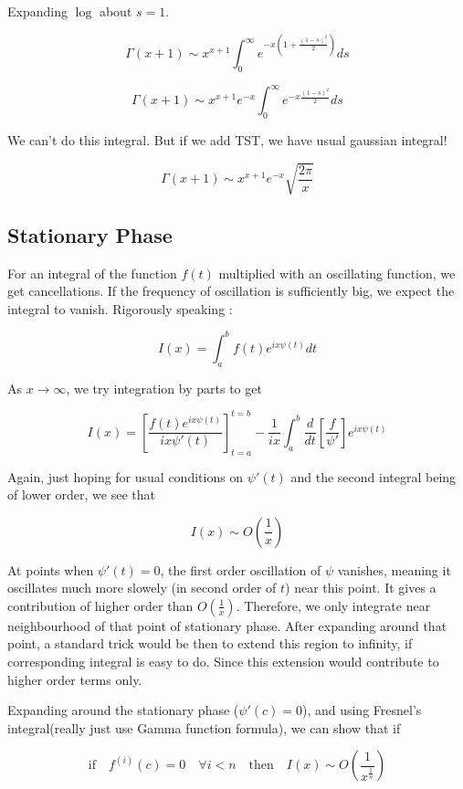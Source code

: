 \documentclass{report}
\begin{document}
\noindent Expanding $\log$ about $s=1$.

$$\Gamma(x+1) \sim x^{x+1}\int_{0}^{\infty}e^{-x\left(1+\frac{(1-s)^2}{2}\right)}ds$$

$$\Gamma(x+1) \sim x^{x+1}e^{-x}\int_{0}^{\infty}e^{-x\frac{(1-s)^2}{2}}ds$$

\noindent We can't do this integral. But if we add TST, we have usual gaussian integral!

$$\Gamma(x+1) \sim x^{x+1}e^{-x} \sqrt{\frac{2\pi}{x}}$$

\subsection{Stationary Phase}

For an integral of the function $f(t)$ multiplied with an oscillating function, we get cancellations. If the frequency of oscillation is sufficiently big, we expect the integral to vanish. Rigorously speaking :

$$I(x) = \int_{a}^{b}f(t)e^{ix\psi(t)}dt$$

\noindent As $x\to\infty$, we try integration by parts to get


$$I(x) = \left[\frac{f(t)e^{ix\psi(t)}}{ix\psi'(t)}\right]_{t=a}^{t=b} - \frac{1}{ix}\int_{a}^{b}\frac{d}{dt}\left[\frac{f}{\psi'}\right]e^{ix\psi(t)}$$

\noindent Again, just hoping for usual conditions on $\psi'(t)$ and the second integral being of lower order, we see that 

$$I(x) \sim O\left(\frac{1}{x}\right)$$

\noindent At points when $\psi'(t) = 0$, the first order oscillation of $\psi$ vanishes, meaning it oscillates much more slowely (in second order of $t$) near this point. It gives a contribution of higher order than $O(\frac{1}{x})$. Therefore, we only integrate near neighbourhood of that point of stationary phase. After expanding around that point, a standard trick would be then to extend this region to infinity, if corresponding integral is easy to do. Since this extension would contribute to higher order terms only.

\noindent Expanding around the stationary phase ($\psi'(c) =0 $), and using Fresnel's integral(really just use Gamma function formula), we can show that if 

$$\mathrm{if}\quad f^{(i)}(c) = 0 \quad\forall i<n \quad \mathrm{then} \quad  I(x) \sim O\left(\frac{1}{x^{\frac{1}{n}}}\right)$$
\end{document}
